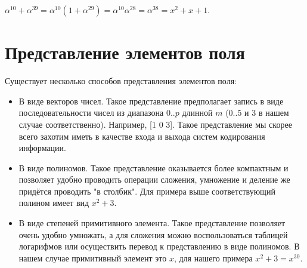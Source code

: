 \documentclass[a4paper,14pt]{extarticle}
\begin{document}
	$\alpha^{10} + \alpha^{39} = \alpha^{10} (1 + \alpha^{29}) = \alpha^{10}\alpha^{28} = \alpha^{38} = x^2 + x + 1$.
	
	\section{Представление элементов поля}
	
	Существует несколько способов представления элементов поля:
	
	\begin{itemize}
		\item В виде векторов чисел. Такое представление предполагает запись в виде последовательности чисел из диапазона $0..p$ длинной $m$ ($0..5$ и 3 в нашем случае соответственно). Например, [1 0 3]. Такое представление мы скорее всего захотим иметь в качестве входа и выхода систем кодирования информации.
		
		\item В виде полиномов. Такое представление оказывается более компактным и позволяет удобно проводить операции сложения, умножение и деление же придётся проводить "в столбик". Для примера выше соответствующий полином имеет вид $x^2 + 3$.
		
		\item В виде степеней примитивного элемента. Такое представление позволяет очень удобно умножать, а для сложения можно воспользоваться таблицей логарифмов или осуществить перевод к представлению в виде полиномов. В нашем случае примитивный элемент это $x$, для нашего примера $x^2 + 3 = x ^ {30}$.
	\end{itemize}
	
\end{document}
